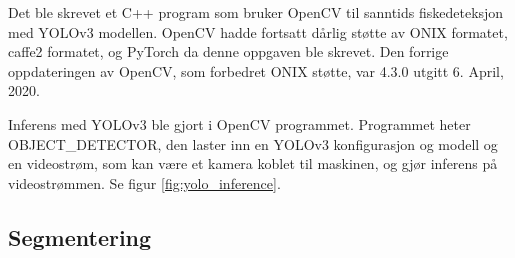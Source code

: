 Det ble skrevet et C++ program som bruker OpenCV til sanntids fiskedeteksjon med YOLOv3 modellen. OpenCV hadde fortsatt dårlig støtte av ONIX formatet, caffe2 formatet, og PyTorch da denne oppgaven ble skrevet. Den forrige oppdateringen av OpenCV, som forbedret ONIX støtte, var 4.3.0 utgitt 6. April, 2020. \cite{OpenCV Team 2020}

Inferens med YOLOv3 ble gjort i OpenCV programmet. Programmet heter OBJECT\_DETECTOR, den laster inn en YOLOv3 konfigurasjon og modell og en videostrøm, som kan være et kamera koblet til maskinen, og gjør inferens på videostrømmen. Se figur \ref{fig:yolo_inference}.


\subsection{Segmentering}